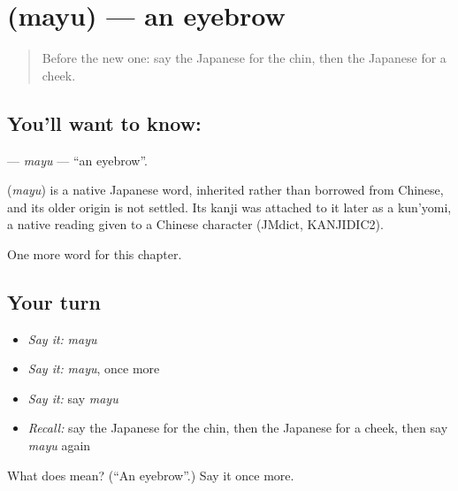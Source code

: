\section[\texorpdfstring{\ja{まゆ} (mayu)}{まゆ (mayu)}]{ (mayu) — an eyebrow}

\label{lesson:JA-C21-mayu}



\begin{quote}
Before the new one: say the Japanese for the chin, then the Japanese for a cheek.
\end{quote}

\subsection*{You'll want to know: }
\textbf{} — \emph{mayu} — \textquotedblleft{}an eyebrow\textquotedblright{}.

\begin{cousinweb}
\textbf{} (\emph{mayu}) is a native Japanese word, inherited rather than borrowed from Chinese, and its older origin is not settled. Its kanji was attached to it later as a kun'yomi, a native reading given to a Chinese character (JMdict, KANJIDIC2).
\end{cousinweb}

\begin{grammarlens}[title={What you've built}]
One more word for this chapter.
\end{grammarlens}

\subsection*{Your turn}
\begin{itemize}
\raggedright
  \item \emph{Say it:} \emph{mayu}
  \item \emph{Say it:} \emph{mayu}, once more
  \item \emph{Say it:} say \emph{mayu}
  \item \emph{Recall:} say the Japanese for the chin, then the Japanese for a cheek, then say \emph{mayu} again
\end{itemize}

\begin{tcolorbox}[breakable,colback=teal!4,colframe=teal!35!black,title={Before you move on}]
What does  mean? (\textquotedblleft{}An eyebrow\textquotedblright{}.) Say it once more.
\end{tcolorbox}
